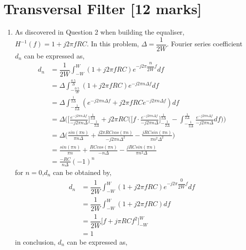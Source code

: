 \documentclass[11pt]{article}
\begin{document}
\section{Transversal Filter [12 marks]}
\begin{enumerate}[label=(\alph*)]
\item %
As discovered in Question 2 when building the equaliser, $H^{-1}(f) = 1 + j2\pi fRC$. In this problem, $\Delta=\dfrac{1}{2W}$. Fourier series coefficient $d_n$ can be expressed as, %
\begin{align*}
    d_n &=\dfrac{1}{2W} \int^{W}_{-W} (1 + j2\pi fRC) e^{-j2\pi \dfrac{n}{2W} f} df \\
    &=\Delta \int^{\frac{0.5}{\Delta}}_{-\frac{0.5}{\Delta}} (1 + j2\pi fRC)e^{-j2\pi n \Delta f} df \\
    &= \Delta \int^{\frac{1}{2\Delta}}_{-\frac{1}{2\Delta}} (e^{-j2\pi n \Delta f} + j2\pi fRC e^{-j2\pi n \Delta f}) df \\
    &= \Delta \Biggr(\Biggr[\frac{e^{-j2\pi n \Delta f}}{-j2\pi n \Delta}\Biggr]^{\frac{1}{2\Delta}}_{-\frac{1}{2\Delta}}
    + j2\pi RC\Big(\Big [f \cdot \frac{e^{-j2\pi n \Delta f}}{-j2\pi n \Delta} \Big]^{\frac{1}{2\Delta}}_{-\frac{1}{2\Delta}} - \int^{\frac{1}{2\Delta}}_{-\frac{1}{2\Delta}} \frac{e^{-j2\pi n \Delta f} }{-j2\pi n \Delta }df\Big)
    \Biggr)\\
    &= \Delta \Biggr( \frac{sin(\pi n)}{\pi n \Delta}  + \frac{j2\pi RC cos(\pi n)}{-j2\pi n\Delta^2} - \frac{jRC sin(\pi n)}{\pi n^2 \Delta^2} \Biggr)  \\
    &=  \frac{sin(\pi n)}{\pi n }  + \frac{ RC cos(\pi n)}{- n\Delta} - \frac{jRC sin(\pi n)}{\pi n^2 \Delta}   \\
    &= \frac{ -RC }{ n\Delta}(-1)^n
\end{align*}
for $n=0$,$d_n$ can be obtained by, 
\begin{align*}
d_n &=\dfrac{1}{2W} \int^{W}_{-W} (1 + j2\pi fRC) e^{-j2\pi \dfrac{0}{2W} f} df \\
&=\dfrac{1}{2W} \int^{W}_{-W} (1 + j2\pi fRC) df\\
&=\dfrac{1}{2W} \Big [f+j\pi RC f^2 \Big] _{-W}^{W} \\
&= 1
\end{align*}
in conclusion, $d_n$ can be expressed as,
\begin{align*}

\end{align*}
\end{enumerate}
\end{document}
